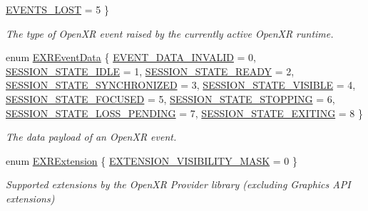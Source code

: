 \begin{DoxyCompactItemize}
\mbox{\hyperlink{namespace_open_x_r_provider_aa80d286c249d35071f2ff4d19d9dc4c3ac3a23aa5a60beea1c939e80d191229ca}{E\+V\+E\+N\+T\+S\+\_\+\+L\+O\+ST}} = 5
 \}
\begin{DoxyCompactList}\small\item\em The type of Open\+XR event raised by the currently active Open\+XR runtime. \end{DoxyCompactList}\item 
enum \mbox{\hyperlink{namespace_open_x_r_provider_a45de367abcea927b192e21d1c8b9853d}{E\+X\+R\+Event\+Data}} \{ \newline
\mbox{\hyperlink{namespace_open_x_r_provider_a45de367abcea927b192e21d1c8b9853da997161bd7da303efa7ad15a7f8822785}{E\+V\+E\+N\+T\+\_\+\+D\+A\+T\+A\+\_\+\+I\+N\+V\+A\+L\+ID}} = 0, 
\mbox{\hyperlink{namespace_open_x_r_provider_a45de367abcea927b192e21d1c8b9853daa3b9036ff98c585c242f695e6c84ac73}{S\+E\+S\+S\+I\+O\+N\+\_\+\+S\+T\+A\+T\+E\+\_\+\+I\+D\+LE}} = 1, 
\mbox{\hyperlink{namespace_open_x_r_provider_a45de367abcea927b192e21d1c8b9853da67151eda1481cf5be744e14ac547b5ad}{S\+E\+S\+S\+I\+O\+N\+\_\+\+S\+T\+A\+T\+E\+\_\+\+R\+E\+A\+DY}} = 2, 
\mbox{\hyperlink{namespace_open_x_r_provider_a45de367abcea927b192e21d1c8b9853da622e21f2be0137b273203c4e25651ed7}{S\+E\+S\+S\+I\+O\+N\+\_\+\+S\+T\+A\+T\+E\+\_\+\+S\+Y\+N\+C\+H\+R\+O\+N\+I\+Z\+ED}} = 3, 
\newline
\mbox{\hyperlink{namespace_open_x_r_provider_a45de367abcea927b192e21d1c8b9853da58182d525d291667c7b0f4a884adc607}{S\+E\+S\+S\+I\+O\+N\+\_\+\+S\+T\+A\+T\+E\+\_\+\+V\+I\+S\+I\+B\+LE}} = 4, 
\mbox{\hyperlink{namespace_open_x_r_provider_a45de367abcea927b192e21d1c8b9853da0e5e5d205a9c8b0cd7631980c152c64c}{S\+E\+S\+S\+I\+O\+N\+\_\+\+S\+T\+A\+T\+E\+\_\+\+F\+O\+C\+U\+S\+ED}} = 5, 
\mbox{\hyperlink{namespace_open_x_r_provider_a45de367abcea927b192e21d1c8b9853da5291b6afca2465c8293baa5aa5a0c481}{S\+E\+S\+S\+I\+O\+N\+\_\+\+S\+T\+A\+T\+E\+\_\+\+S\+T\+O\+P\+P\+I\+NG}} = 6, 
\mbox{\hyperlink{namespace_open_x_r_provider_a45de367abcea927b192e21d1c8b9853dae1118c60be3405cf3b09e49594d011f2}{S\+E\+S\+S\+I\+O\+N\+\_\+\+S\+T\+A\+T\+E\+\_\+\+L\+O\+S\+S\+\_\+\+P\+E\+N\+D\+I\+NG}} = 7, 
\newline
\mbox{\hyperlink{namespace_open_x_r_provider_a45de367abcea927b192e21d1c8b9853dac36a3497630be208504c1c413843041c}{S\+E\+S\+S\+I\+O\+N\+\_\+\+S\+T\+A\+T\+E\+\_\+\+E\+X\+I\+T\+I\+NG}} = 8
 \}
\begin{DoxyCompactList}\small\item\em The data payload of an Open\+XR event. \end{DoxyCompactList}\item 
enum \mbox{\hyperlink{namespace_open_x_r_provider_ab4e3f4c6f1f2b69f87608b992c505371}{E\+X\+R\+Extension}} \{ \mbox{\hyperlink{namespace_open_x_r_provider_ab4e3f4c6f1f2b69f87608b992c505371a18a9581473453414550c09bd6750b050}{E\+X\+T\+E\+N\+S\+I\+O\+N\+\_\+\+V\+I\+S\+I\+B\+I\+L\+I\+T\+Y\+\_\+\+M\+A\+SK}} = 0
 \}
\begin{DoxyCompactList}\small\item\em Supported extensions by the Open\+XR Provider library (excluding Graphics A\+PI extensions) \end{DoxyCompactList}\end{DoxyCompactItemize}
